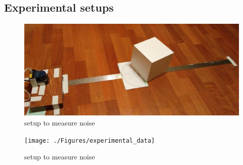 \begin{appendices}
\chapter{Experimental setups}

\begin{figure}
\centering
 	\includegraphics[width=1\textwidth,trim = 0mm 0mm 0mm 0mm,clip=true]{./Figures/noise_setup}\vspace*{0ex}
  	\caption{setup to measure noise} \label{fig:noise_setup}
\end{figure}

\begin{figure}
\centering
	 	\texttt{[image: ./Figures/experimental\_data]}\vspace*{0ex}
	  	\caption{setup to measure noise} \label{fig:experimental_data}
\end{figure}

\end{appendices}